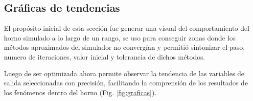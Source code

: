 \subsection{Gráficas de tendencias}

\par El propósito inicial de esta sección fue generar una visual del comportamiento del horno simulado a lo largo de un rango, se uso para conseguir zonas donde los métodos aproximados del simulador no convergían y permitió sintonizar el paso, numero de iteraciones, valor inicial y tolerancia de dichos métodos.
\par Luego de ser optimizada ahora permite observar la tendencia de las variables de salida seleccionadas con precisión, facilitando la comprensión de los resultados de los fenómenos dentro del horno (Fig. \ref{fig:graficas}).